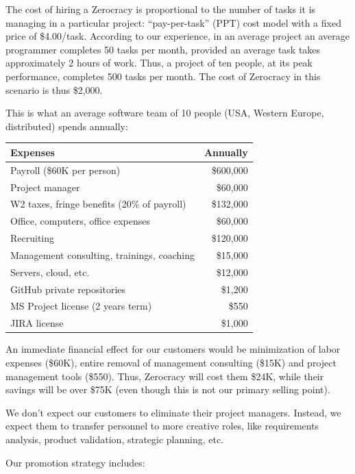 \documentclass{main}
\begin{document}
The cost of hiring a Zerocracy is proportional to the number of tasks it is
managing in a particular project: ``pay-per-task'' (PPT) cost model with
a fixed price of \$4.00/task. According to our experience, in an average project an average
programmer completes 50 tasks per month, provided an average task takes
approximately 2 hours of work. Thus, a project of ten people, at its peak
performance, completes 500 tasks per month. The cost of Zerocracy in this
scenario is thus \$2,000.

This is what an average software team of 10 people (USA, Western Europe, distributed) spends annually:

\begin{tabular}{lr}
\hline
Expenses & Annually \\
\hline
Payroll (\$60K per person) & \$600,000 \\
Project manager & \$60,000 \\
W2 taxes, fringe benefits (20\% of payroll) & \$132,000 \\
Office, computers, office expenses & \$60,000 \\
Recruiting & \$120,000 \\
Management consulting, trainings, coaching & \$15,000 \\
Servers, cloud, etc. & \$12,000 \\
GitHub private repositories & \$1,200 \\
MS Project license (2 years term) & \$550 \\
JIRA license & \$1,000 \\
\hline
\end{tabular}
\vspace{1em}

An immediate financial effect for our customers would be minimization of labor
expenses (\$60K), entire removal of management consulting (\$15K) and project
management tools (\$550). Thus, Zerocracy will cost them \$24K, while their
savings will be over \$75K (even though this is not our primary selling point).

We don't expect our customers to eliminate their project managers. Instead, we
expect them to transfer personnel to more creative roles, like requirements
analysis, product validation, strategic planning, etc.

Our promotion strategy includes:
\end{document}
